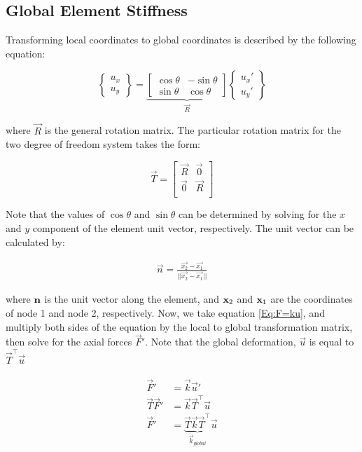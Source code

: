 \subsection{Global Element Stiffness}

Transforming local coordinates to global coordinates is described by the following equation:

\begin{equation}
	\begin{Bmatrix}
		u_x\\ u_y
	\end{Bmatrix}
	=
	\underbrace{
		\begin{bmatrix}
			\cos\theta & -\sin\theta\\
			\sin\theta & \cos\theta
	\end{bmatrix}
	}_{\vec{R}}
	\begin{Bmatrix}
		u_x'\\ u_y'
	\end{Bmatrix}
\end{equation}

where $\vec{R}$ is the general rotation matrix. The particular rotation matrix for the two degree of freedom system takes the form:

\begin{equation}
	\vec{T}
	=	
	\begin{bmatrix}
		\vec{R} & \vec{0}\\
		\vec{0} & \vec{R}\\
	\end{bmatrix}
\end{equation}

Note that the values of $\cos\theta$ and $\sin\theta$ can be determined by solving for the $x$ and $y$ component of the element unit vector, respectively. The unit vector can be calculated by:

\begin{align}
	\vec{n} = \frac{\vec{x_2}-\vec{x_1}}{||\vec{x_2}-\vec{x_1}||}
\end{align}

where $\mathbf{n}$ is the unit vector along the element, and $\mathbf{x}_2$ and $\mathbf{x}_1$ are the coordinates of node 1 and node 2, respectively. Now, we take equation \ref{Eq:F=ku}, and multiply both sides of the equation by the local to global transformation matrix, then solve for the axial forces $\vec{F}'$. Note that the global deformation, $\vec{u}$ is equal to $\vec{T}^\intercal \vec{u}$

\begin{align}
	\vec{F}' &= \vec{k} \vec{u}'\\
	\vec{T} \vec{F}' &= \vec{k} \vec{T}^\intercal \vec{u}\\
	\vec{F}' &= \underbrace{\vec{T} \vec{k} \vec{T}^\intercal}_{\vec{k}_{global}} \vec{u}
\end{align}

